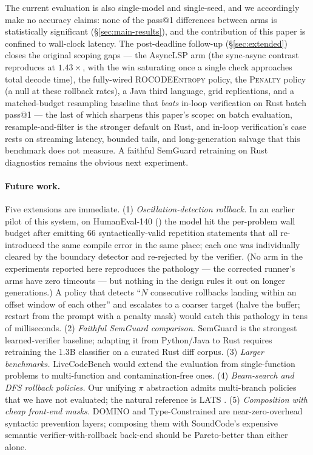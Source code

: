 The current evaluation is also single-model and single-seed, and
we accordingly make no accuracy claims: none of the pass@1
differences between arms is statistically significant
(\S\ref{sec:main-results}), and the contribution of this paper is
confined to wall-clock latency. The post-deadline follow-up
(\S\ref{sec:extended}) closes the original scoping
gaps --- the AsyncLSP arm (the sync-async contrast reproduces at
$1.43\times$, with the win saturating once a single check
approaches total decode time), the fully-wired
\textsc{ROCODEEntropy} policy, the \textsc{Penalty} policy (a
null at these rollback rates), a Java third language,
grid replications, and a
matched-budget resampling baseline that \emph{beats} in-loop
verification on Rust batch pass@1 --- the last of which sharpens
this paper's scope: on batch evaluation,
resample-and-filter is the stronger default on Rust, and in-loop
verification's case rests on streaming latency, bounded tails,
and long-generation salvage that this benchmark does not measure.
A faithful SemGuard retraining on
Rust diagnostics remains the obvious next experiment.

\paragraph{Future work.}
Five extensions are immediate.
(1) \emph{Oscillation-detection rollback.} In an earlier pilot of
this system, on HumanEval-140 () the model hit
the per-problem wall budget after
emitting $66$ syntactically-valid repetition statements that all
re-introduced the same compile error in the same place; each one was
individually cleared by the boundary detector and re-rejected by the
verifier. (No arm in the experiments reported here reproduces the
pathology --- the corrected runner's arms have zero timeouts ---
but nothing in the design rules it out on longer generations.) A
policy that detects ``$N$ consecutive rollbacks landing
within an offset window of each other'' and escalates to a coarser
target (halve the buffer; restart from the prompt with a penalty
mask) would catch this pathology in tens of milliseconds.
(2) \emph{Faithful SemGuard
comparison.} SemGuard is the strongest learned-verifier baseline;
adapting it from Python/Java to Rust requires retraining the 1.3B
classifier on a curated Rust diff corpus.
(3) \emph{Larger benchmarks.} LiveCodeBench
\citep{jain2024livecodebench} would extend the evaluation from
single-function problems to multi-function and contamination-free
ones. (4) \emph{Beam-search and DFS rollback policies.} Our
unifying $\pi$ abstraction admits multi-branch policies that we
have not evaluated; the natural reference is
LATS \citep{zhou2024lats}. (5) \emph{Composition with cheap
front-end masks.} DOMINO \citep{beurerkellner2024domino} and
Type-Constrained \citep{mundler2025typeconstrained} are
near-zero-overhead syntactic prevention layers; composing them with
SoundCode's expensive semantic verifier-with-rollback back-end
should be Pareto-better than either alone.


